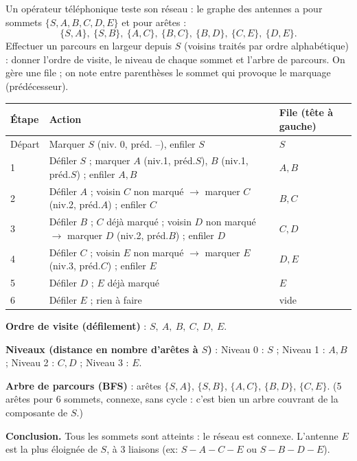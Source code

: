 \documentclass[11pt]{article}
\begin{document}
\begin{exoresolu}
Un opérateur téléphonique teste son réseau : le graphe des antennes a pour sommets $\{S,A,B,C,D,E\}$ et pour arêtes :
\[\{S,A\},\ \{S,B\},\ \{A,C\},\ \{B,C\},\ \{B,D\},\ \{C,E\},\ \{D,E\}.\]
Effectuer un parcours en largeur depuis $S$ (voisins traités par ordre alphabétique) : donner l'ordre de visite, le niveau de chaque sommet et l'arbre de parcours.
\tcblower
On gère une file ; on note entre parenthèses le sommet qui provoque le marquage (prédécesseur).

\begin{center}
\begin{tabularx}{\linewidth}{|l|X|X|}
\hline
\rowcolor{popblueL} \textbf{Étape} & \textbf{Action} & \textbf{File (tête à gauche)} \\
\hline
Départ & Marquer $S$ (niv. 0, préd. --), enfiler $S$ & $S$ \\
\hline
1 & Défiler $S$ ; marquer $A$ (niv.1, préd.$S$), $B$ (niv.1, préd.$S$) ; enfiler $A,B$ & $A, B$ \\
\hline
2 & Défiler $A$ ; voisin $C$ non marqué $\to$ marquer $C$ (niv.2, préd.$A$) ; enfiler $C$ & $B, C$ \\
\hline
3 & Défiler $B$ ; $C$ déjà marqué ; voisin $D$ non marqué $\to$ marquer $D$ (niv.2, préd.$B$) ; enfiler $D$ & $C, D$ \\
\hline
4 & Défiler $C$ ; voisin $E$ non marqué $\to$ marquer $E$ (niv.3, préd.$C$) ; enfiler $E$ & $D, E$ \\
\hline
5 & Défiler $D$ ; $E$ déjà marqué & $E$ \\
\hline
6 & Défiler $E$ ; rien à faire & vide \\
\hline
\end{tabularx}
\end{center}

\textbf{Ordre de visite (défilement)} : $S,\ A,\ B,\ C,\ D,\ E$.

\textbf{Niveaux (distance en nombre d'arêtes à $S$)} :
Niveau 0 : $S$ ; Niveau 1 : $A, B$ ; Niveau 2 : $C, D$ ; Niveau 3 : $E$.

\textbf{Arbre de parcours (BFS)} : arêtes $\{S,A\}$, $\{S,B\}$, $\{A,C\}$, $\{B,D\}$, $\{C,E\}$.
(5 arêtes pour 6 sommets, connexe, sans cycle : c'est bien un arbre couvrant de la composante de $S$.)

\textbf{Conclusion.} Tous les sommets sont atteints : le réseau est connexe. L'antenne $E$ est la plus éloignée de $S$, à 3 liaisons (ex: $S-A-C-E$ ou $S-B-D-E$).
\end{exoresolu}
\end{document}
